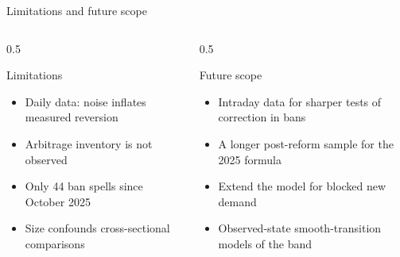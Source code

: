 \documentclass[11pt]{beamer}
\begin{document}
\begin{frame}{Limitations and future scope}
  \begin{columns}[T]
    \begin{column}{0.5\textwidth}
      \begin{alertblock}{Limitations}
        \scriptsize
        \begin{itemize}
          \item Daily data: noise inflates measured reversion
          \item Arbitrage inventory is not observed
          \item Only 44 ban spells since October 2025
          \item Size confounds cross-sectional comparisons
        \end{itemize}
      \end{alertblock}
    \end{column}
    \begin{column}{0.5\textwidth}
      \begin{exampleblock}{Future scope}
        \scriptsize
        \begin{itemize}
          \item Intraday data for sharper tests of correction in bans
          \item A longer post-reform sample for the 2025 formula
          \item Extend the model for blocked new demand
          \item Observed-state smooth-transition models of the band
        \end{itemize}
      \end{exampleblock}
    \end{column}
  \end{columns}
\end{frame}
\end{document}
